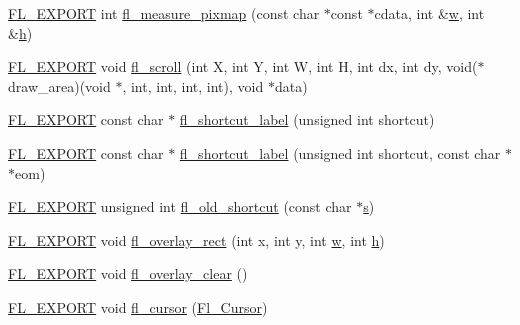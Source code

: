 \begin{DoxyCompactItemize}
\item 
\hyperlink{_fl___export_8_h_aa9ba29a18aee9d738370a06eeb4470fc}{F\+L\+\_\+\+E\+X\+P\+O\+RT} int \hyperlink{group__fl__drawings_gaedf85a71995496e7cc00b1367d7490b3}{fl\+\_\+measure\+\_\+pixmap} (const char $\ast$const $\ast$cdata, int \&\hyperlink{forms_8_h_aac374e320caaadeca4874add33b62af2}{w}, int \&\hyperlink{forms_8_h_a7e427ba5b307f9068129699250690066}{h})
\item 
\hyperlink{_fl___export_8_h_aa9ba29a18aee9d738370a06eeb4470fc}{F\+L\+\_\+\+E\+X\+P\+O\+RT} void \hyperlink{group__fl__drawings_gaef4a0d81bfafaeb3be15a55b9b58ba5f}{fl\+\_\+scroll} (int X, int Y, int W, int H, int dx, int dy, void($\ast$draw\+\_\+area)(void $\ast$, int, int, int, int), void $\ast$data)
\item 
\hyperlink{_fl___export_8_h_aa9ba29a18aee9d738370a06eeb4470fc}{F\+L\+\_\+\+E\+X\+P\+O\+RT} const char $\ast$ \hyperlink{group__fl__drawings_gadfd8bd4a9143e4238da84d031bfd1815}{fl\+\_\+shortcut\+\_\+label} (unsigned int shortcut)
\item 
\hyperlink{_fl___export_8_h_aa9ba29a18aee9d738370a06eeb4470fc}{F\+L\+\_\+\+E\+X\+P\+O\+RT} const char $\ast$ \hyperlink{group__fl__drawings_ga035deb6aa074fd5df1419412ba370410}{fl\+\_\+shortcut\+\_\+label} (unsigned int shortcut, const char $\ast$$\ast$eom)
\item 
\hyperlink{_fl___export_8_h_aa9ba29a18aee9d738370a06eeb4470fc}{F\+L\+\_\+\+E\+X\+P\+O\+RT} unsigned int \hyperlink{group__fl__drawings_ga6f6f1aea3b90a03c1714336e7aef349d}{fl\+\_\+old\+\_\+shortcut} (const char $\ast$\hyperlink{forms_8_h_a672b4f0a8c8a6db61068c721f799d87f}{s})
\item 
\hyperlink{_fl___export_8_h_aa9ba29a18aee9d738370a06eeb4470fc}{F\+L\+\_\+\+E\+X\+P\+O\+RT} void \hyperlink{group__fl__drawings_gab0856445ac32f9b4606bca24cce63c7e}{fl\+\_\+overlay\+\_\+rect} (int x, int y, int \hyperlink{forms_8_h_aac374e320caaadeca4874add33b62af2}{w}, int \hyperlink{forms_8_h_a7e427ba5b307f9068129699250690066}{h})
\item 
\hyperlink{_fl___export_8_h_aa9ba29a18aee9d738370a06eeb4470fc}{F\+L\+\_\+\+E\+X\+P\+O\+RT} void \hyperlink{group__fl__drawings_ga9d2c84bf8448312d165c286458e4984d}{fl\+\_\+overlay\+\_\+clear} ()
\item 
\hyperlink{_fl___export_8_h_aa9ba29a18aee9d738370a06eeb4470fc}{F\+L\+\_\+\+E\+X\+P\+O\+RT} void \hyperlink{group__fl__drawings_gac34f54a80fa846cf66f160bc02940bd2}{fl\+\_\+cursor} (\hyperlink{_enumerations_8_h_a72bde974edc7926b1217dd51b8c7e8e0}{Fl\+\_\+\+Cursor})
\item 
$$
\end{DoxyCompactItemize}
